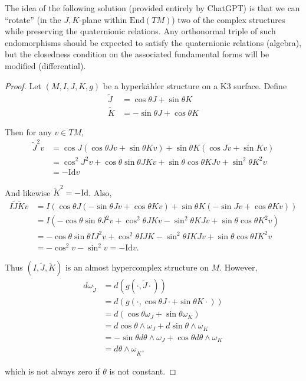 \documentclass{book}
\begin{document}
\noindent
The idea of the following solution
(provided entirely by ChatGPT)
is that we can ``rotate''
(in the $J,K$-plane within $\text{End}(TM)$)
two of the complex structures while
preserving the
quaternionic relations.
Any orthonormal triple of such endomorphisms
should be expected to satisfy the
quaternionic relations (algebra),
but the closedness condition on the
associated fundamental
forms will be modified (differential).

\begin{proof}
Let $(M,I,J,K,g)$ be a hyperkähler structure
on a K3 surface.
Define
$$
\begin{aligned}
\tilde{J}&=\cos \theta J+ \sin \theta K\\
\tilde{K}&=-\sin \theta J + \cos \theta K
\end{aligned}
$$

\noindent
Then for any $v \in TM$,
$$
\begin{aligned}
\tilde{J}^2v&=\cos J(\cos \theta Jv+ \sin
\theta Kv)
+\sin \theta K (\cos J v + \sin Kv)\\
&=\cos^2J^2v+\cos \theta \sin \theta J K v
+ \sin \theta \cos \theta K J v + \sin^2
\theta K^2 v\\
&=-\text{Id} v
\end{aligned}
$$

\noindent
And likewise $\tilde{K}^2=-\text{Id}$.
Also,
$$
\begin{aligned}
I \tilde{J} \tilde{K}v&=
I(\cos\theta J(-\sin \theta Jv+\cos \theta
Kv)
+\sin \theta K (- \sin Jv+ \cos \theta Kv))\\
&=I (-\cos \theta \sin \theta J^2 v
+ \cos^2 \theta J K v
- \sin^2 \theta K J v
+\sin \theta \cos \theta K^2 v)\\
&=-\cos \theta \sin \theta I J^2 v
+ \cos^2 \theta I J K
- \sin^2 \theta I K J v
+ \sin \theta \cos \theta I K^2 v\\
&=-\cos^2v- \sin^2v=-\text{Id}v.
\end{aligned}
$$

\noindent
Thus $(I,\tilde{J},\tilde{K})$ is an almost
hypercomplex
structure on $M$.
However,
$$
\begin{aligned}
d
\omega_{\tilde{J}}&=d(g(\cdot,\tilde{J}\cdot)
)\\
&=d(g(\cdot,\cos \theta J\cdot + \sin \theta
K\cdot))\\
&=d(\cos \theta \omega_J + \sin \theta
\omega_K)\\
&=d \cos \theta \wedge \omega_J + d \sin
\theta \wedge \omega_K\\
&=-\sin \theta
d\theta\wedge\omega_J+\cos\theta
d\theta\wedge\omega_K\\
&=d \theta \wedge \omega_{\tilde{K}},
\end{aligned}
$$

\noindent
which is not always zero if $\theta$ is not
constant.
\end{proof}
\end{document}
